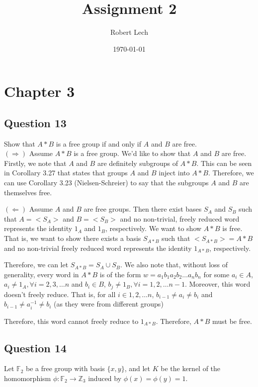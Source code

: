 \documentclass[12pt]{article}%
\newcommand{\F}{\mathbb{F}}
\newcommand{\Z}{\mathbb{Z}}
\begin{document}
\title{Assignment 2}
\author{Robert Lech}
\date{\today}
\maketitle
\section*{Chapter 3}

\subsection*{Question 13}

Show that $A*B$ is a free group if and only if $A$ and $B$ are free.\\

$(\Rightarrow)$ Assume $A*B$ is a free group. We'd like to show that $A$ and $B$ are free. Firstly, we
note that $A$ and $B$ are definitely subgroups of $A*B$. This can be seen in Corollary 3.27 that states
that groups $A$ and $B$ inject into $A*B$. Therefore, we can use Corollary 3.23 (Nielsen-Schreier) to say
that the subgroups $A$ and $B$ are themselves free.

$(\Leftarrow)$ Assume $A$ and $B$ are free groups. Then there exist bases $S_A$ and $S_B$ such that
$A=<S_A>$ and $B=<S_B>$ and no non-trivial, freely reduced word represents the identity $1_A$ and $1_B$,
respectively. We want to show $A*B$ is free. That is, we want to show there exists a basis $S_{A*B}$ such
that $<S_{A*B}>=A*B$ and no non-trivial freely reduced word represents the identity $1_{A*B}$,
respectively.

Therefore, we can let $S_{A*B}=S_A \cup S_B$. We also note that, without loss of generality, every word in
$A*B$ is of the form $w=a_{1}b_{1}a_{2}b_{2}\ldots a_{n}b_{n}$ for some $a_i\in A$, $a_i \neq 1_A, \forall
i=2,3,\ldots n$ and $b_i\in B$, $b_j \neq 1_B, \forall i=1,2,\ldots n-1$. Moreover, this word doesn't
freely reduce. That is, for all $i\in {1, 2, \ldots n}$, $b_{i-1} \neq a_i \neq b_i$ and $b_{i-1} \neq
a_i^{-1} \neq b_i$ (as they were from different groups)

Therefore, this word cannot freely reduce to $1_{A*B}$. Therefore, $A*B$ must be free.

\subsection*{Question 14}

Let $\F_2$ be a free group with basis $\{x,y\}$, and let $K$
 be the kernel of the homomorphism $\phi:\F_2\rightarrow \Z_3$ induced by $\phi(x)=\phi(y)=1$.
\end{document}
